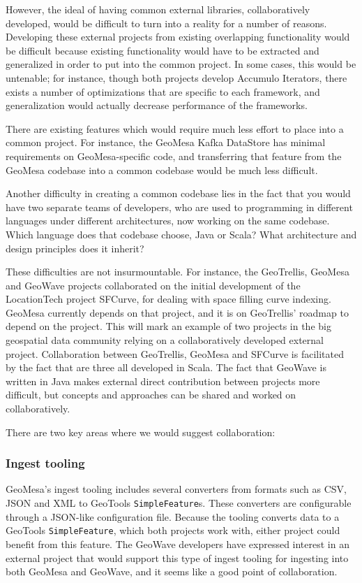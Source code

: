 However, the ideal of having common external libraries, collaboratively developed, would be difficult to turn into a reality for a number of reasons.
Developing these external projects from existing overlapping functionality would be difficult because existing functionality would have to be extracted and generalized in order to put into the common project.
In some cases, this would be untenable; for instance, though both projects develop Accumulo Iterators, there exists a number of optimizations that are specific to each framework, and generalization would actually decrease performance of the frameworks.

There are existing features which would require much less effort to place into a common project.
For instance, the GeoMesa Kafka DataStore has minimal requirements on GeoMesa-specific code, and transferring that feature from the GeoMesa codebase into a common codebase would be much less difficult.

Another difficulty in creating a common codebase lies in the fact that you would have two separate teams of developers, who are used to programming in different languages under different architectures, now working on the same codebase.
Which language does that codebase choose, Java or Scala? What architecture and design principles does it inherit?

These difficulties are not insurmountable.
For instance, the GeoTrellis, GeoMesa and GeoWave projects collaborated on the initial development of the LocationTech project SFCurve, for dealing with space filling curve indexing.
GeoMesa currently depends on that project, and it is on GeoTrellis' roadmap to depend on the project.
This will mark an example of two projects in the big geospatial data community relying on a collaboratively developed external project.
Collaboration between GeoTrellis, GeoMesa and SFCurve is facilitated by the fact that are three all developed in Scala.
The fact that GeoWave is written in Java makes external direct contribution between projects more difficult, but concepts and approaches can be shared and worked on collaboratively.

There are two key areas where we would suggest collaboration:


\subsubsection{Ingest tooling}
\label{sec:conclusions:collaboration:ingest}

GeoMesa's ingest tooling includes several converters from formats such as CSV, JSON and XML to GeoTools \texttt{SimpleFeature}s.
These converters are configurable through a JSON-like configuration file.
Because the tooling converts data to a GeoTools \texttt{SimpleFeature}, which both projects work with, either project could benefit from this feature.
The GeoWave developers have expressed interest in an external project that would support this type of ingest tooling for ingesting into both GeoMesa and GeoWave, and it seems like a good point of collaboration.

